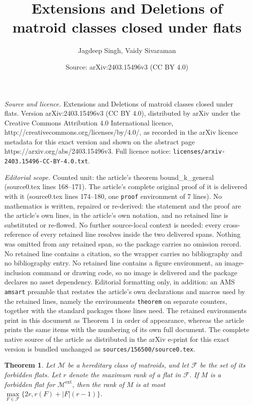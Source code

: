 \documentclass[10pt,a4paper]{amsart}
\title{Extensions and Deletions of matroid classes closed under flats}
\author{Jagdeep Singh, Vaidy Sivaraman}
\date{Source: arXiv:2403.15496v3 (CC BY 4.0)}
\newtheorem{theorem}{Theorem}
\newcommand\Me{\mathcal{M}^\mathrm{ext}}
\begin{document}
\maketitle

\noindent\emph{Source and licence.} Extensions and Deletions of matroid classes closed under flats. Version arXiv:2403.15496v3 (CC BY 4.0), distributed by arXiv under the Creative Commons Attribution 4.0 International licence, http://creativecommons.org/licenses/by/4.0/, as recorded in the arXiv licence metadata for this exact version and shown on the abstract page https://arxiv.org/abs/2403.15496v3. Full licence notice: \texttt{licenses/arxiv-2403.15496-CC-BY-4.0.txt}.\par\smallskip

\noindent\textit{Editorial scope.} Counted unit: the article's theorem bound\_k\_general (source0.tex lines 168--171). The article's complete original proof of it is delivered with it (source0.tex lines 174--180, one \texttt{proof} environment of 7 lines). No mathematics is written, repaired or re-derived: the statement and the proof are the article's own lines, in the article's own notation, and no retained line is substituted or re-flowed.  No further source-local context is needed: every cross-reference of every retained line resolves inside the two delivered spans.  Nothing was omitted from any retained span, so the package carries no omission record.  No retained line contains a citation, so the wrapper carries no bibliography and no bibliography entry.  No retained line contains a figure environment, an image-inclusion command or drawing code, so no image is delivered and the package declares no asset dependency.  Editorial formatting only, in addition: an AMS \texttt{amsart} preamble that restates the article's own declarations and macros used by the retained lines, namely the environments \texttt{theorem} on separate counters, together with the standard packages those lines need.  The retained environments print in this document as Theorem 1 in order of appearance, whereas the article prints the same items with the numbering of its own full document.  The complete native source of the article as distributed in the arXiv e-print for this exact version is bundled unchanged as \texttt{sources/156500/source0.tex}.
\begin{theorem}
\label{bound_k_general}
Let $\mathcal{M}$ be a hereditary class of matroids, and let $\mathcal{F}$ be the set of its forbidden flats. Let $r$ denote the maximum rank of a flat in $\mathcal{F}$. If $M$ is a forbidden flat for $\Me$, then the rank of $M$ is at most $\max\limits_{F \in \mathcal{F}}{\{2r, r(F) + |F|(r-1)\}}$. 
\end{theorem}
\end{document}
